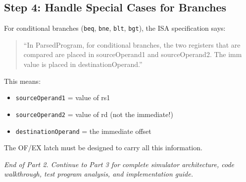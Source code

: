 \documentclass[12pt,a4paper]{article}
\begin{document}
\subsection{Step 4: Handle Special Cases for Branches}

For conditional branches (\texttt{beq}, \texttt{bne}, \texttt{blt}, \texttt{bgt}), the ISA specification says:

\begin{quote}
``In ParsedProgram, for conditional branches, the two registers that are compared are placed in sourceOperand1 and sourceOperand2. The imm value is placed in destinationOperand.''
\end{quote}

This means:
\begin{itemize}
    \item \texttt{sourceOperand1} = value of rs1
    \item \texttt{sourceOperand2} = value of rd (not the immediate!)
    \item \texttt{destinationOperand} = the immediate offset
\end{itemize}

The OF/EX latch must be designed to carry all this information.

\vspace{2cm}
\begin{center}
\textit{End of Part 2. Continue to Part 3 for complete simulator architecture, code walkthrough, test program analysis, and implementation guide.}
\end{center}
\end{document}
